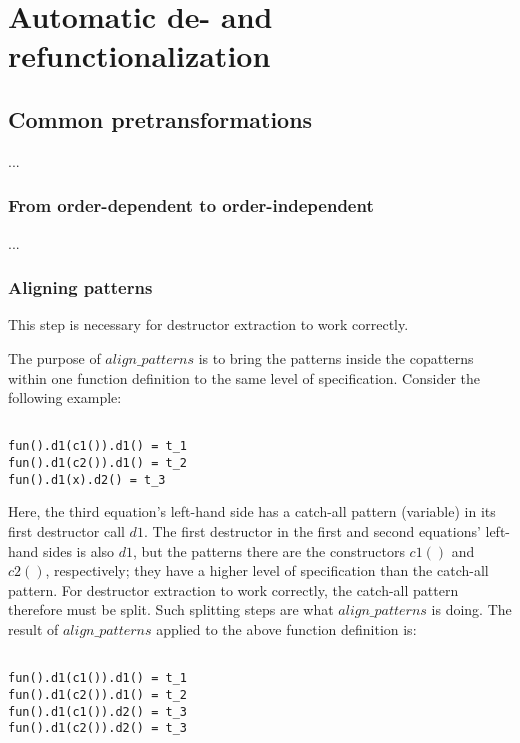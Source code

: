 \chapter{Automatic de- and refunctionalization}

\section{Common pretransformations}

...

\subsection{From order-dependent to order-independent}

...

\subsection{Aligning patterns}

This step is necessary for destructor extraction to work correctly.

The purpose of $align\_patterns$ is to bring the patterns inside the copatterns within one function definition to the same level of specification. Consider the following example:

\begin{lstlisting}

fun().d1(c1()).d1() = t_1
fun().d1(c2()).d1() = t_2
fun().d1(x).d2() = t_3

\end{lstlisting}

Here, the third equation's left-hand side has a catch-all pattern (variable) in its first destructor call $d1$. The first destructor in the first and second equations' left-hand sides is also $d1$, but the patterns there are the constructors $c1()$ and $c2()$, respectively; they have a higher level of specification than the catch-all pattern. For destructor extraction to work correctly, the catch-all pattern therefore must be split. Such splitting steps are what $align\_patterns$ is doing. The result of $align\_patterns$ applied to the above function definition is:

\begin{lstlisting}

fun().d1(c1()).d1() = t_1
fun().d1(c2()).d1() = t_2
fun().d1(c1()).d2() = t_3
fun().d1(c2()).d2() = t_3

\end{lstlisting}

